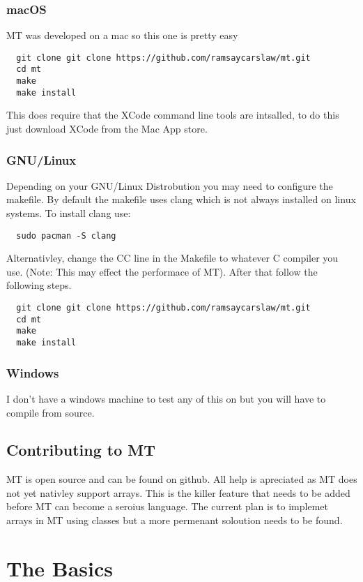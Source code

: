 \documentclass{report}
\begin{document}
\subsection{macOS}
MT was developed on a mac so this one is pretty easy
\begin{lstlisting}
  git clone git clone https://github.com/ramsaycarslaw/mt.git
  cd mt
  make
  make install
\end{lstlisting}
This does require that the XCode command line tools are intsalled, to do this just download XCode from the Mac App store.

\subsection{GNU/Linux}
Depending on your GNU/Linux Distrobution you may need to configure the makefile. By default the makefile uses clang which is not always installed on linux systems. To install clang use:
\begin{lstlisting}
  sudo pacman -S clang
\end{lstlisting}

Alternativley, change the CC line in the Makefile to whatever C compiler you use. (Note: This may effect the performace of MT). After that follow the following steps.
\begin{lstlisting}
  git clone git clone https://github.com/ramsaycarslaw/mt.git
  cd mt
  make
  make install
\end{lstlisting}

\subsection{Windows}
I don't have a windows machine to test any of this on but you will have to compile from source.

\section{Contributing to MT}
MT is open source and can be found on github. All help is apreciated as MT does not yet nativley support arrays. This is the killer feature that needs to be added before MT can become a seroius language. The current plan is to implemet arrays in MT using classes but a more permenant soloution needs to be found.

\chapter{The Basics}
\end{document}
